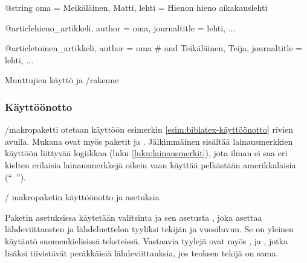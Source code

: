 \begin{esimerkki*}
\begin{koodilohko}
  @string{
    oma = {Meikäläinen, Matti},
    lehti = {Hienon hieno aikakauslehti}
  }

  @article{hieno_artikkeli,
    author = oma,
    journaltitle = lehti,
    ...
  }

  @article{toinen_artikkeli,
    author = oma # { and Teikäläinen, Teija},
    journaltitle = lehti,
    ...
  }
\end{koodilohko}
\caption{Muuttujien käyttö ja \-/rakenne}
\label{esim:bib-muuttujat}
\end{esimerkki*}

\subsubsection{Käyttöönotto}

\-/makropaketti otetaan käyttöön esimerkin
\ref{esim:biblatex-käyttöönotto} rivien avulla. Mukana ovat myös paketit
 ja . Jälkimmäinen sisältää
lainausmerkkien käyttöön liittyvää logiikkaa (luku
\ref{luku:lainausmerkit}), jota ilman  ei saa eri
kielten erilaisia lainausmerkkejä oikein vaan käyttää pelkästään
amerikkalaisia (``~'').

\begin{esimerkki*}

\begin{koodilohko}
  \usepackage{polyglossia}

  \usepackage{csquotes}

  \usepackage[style=authoryear]{biblatex}
\end{koodilohko}
\caption{\-/ makropaketin käyttöönotto ja asetuksia}
\label{esim:biblatex-käyttöönotto}
\end{esimerkki*}

Paketin asetuksissa käytetään valitsinta  ja sen asetusta
, joka asettaa lähdeviittausten ja lähdeluettelon
tyyliksi tekijän ja vuosiluvun. Se on yleinen käytäntö suomenkielisissä
teksteissä. Vastaavia tyylejä ovat myös ,
 ja , jotka lisäksi
tiivistävät peräkkäisiä lähdeviittauksia, jos teoksen tekijä on sama.

